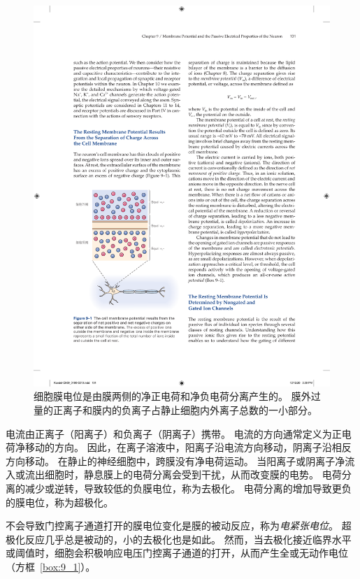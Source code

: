 \begin{figure}[htbp]
	\centering
	\includegraphics[width=0.6\linewidth]{chap09/fig_9_1}
	\caption{细胞膜电位是由膜两侧的净正电荷和净负电荷分离产生的。
		膜外过量的正离子和膜内的负离子占静止细胞内外离子总数的一小部分。}
	\label{fig:9_1}
\end{figure}


电流由正离子（阳离子）和负离子（阴离子）携带。
电流的方向通常定义为正电荷净移动的方向。
因此，在离子溶液中，阳离子沿电流方向移动，阴离子沿相反方向移动。
在静止的神经细胞中，跨膜没有净电荷运动。
当阳离子或阴离子净流入或流出细胞时，静息膜上的电荷分离会受到干扰，从而改变膜的电势。
电荷分离的减少或逆转，导致较低的负膜电位，称为去极化。
电荷分离的增加导致更负的膜电位，称为超极化。


不会导致门控离子通道打开的膜电位变化是膜的被动反应，称为\textit{电紧张电位}。
超极化反应几乎总是被动的，小的去极化也是如此。
然而，当去极化接近临界水平或阈值时，细胞会积极响应电压门控离子通道的打开，从而产生全或无动作电位（方框~\ref{box:9_1}）。


